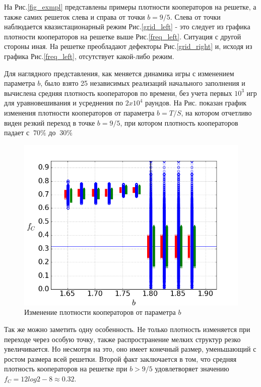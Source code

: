 \documentclass[a4paper]{article}
\begin{document}
	\par На Рис.\ref{fig_exmpl} представлены примеры плотности кооператоров на решетке, а также самих решеток слева и справа от точки $b=9/5$. Слева от точки наблюдается квазистационарный режим Рис.\ref{grid_left} - это следует из графика плотности кооператоров на решетке выше Рис.\ref{freq_left}. Ситуация с другой стороны иная. На решетке преобладают дефекторы Рис.\ref{grid_right} и, исходя из графика Рис.\ref{freq_left}, отсутствует какой-либо режим.
		
	\par Для наглядного представления, как меняется динамика игры с изменением параметра $b$, было взято 25 независимых реализаций начального заполнения и вычислена средняя плотность кооператоров по времени, без учета первых $10^{3}$ игр для уравновешивания и усреднения по $2 x 10^{4}$ раундов. На Рис. показан график изменения плотности кооператоров от параметра $b=T/S$, на котором отчетливо виден резкий переход в точке $b=9/5$, при котором плотность кооператоров падает с $~70\% $ до $~30\%$
	
	\begin{figure}[H]
		\label{freq}
		\centering
		\includegraphics[width=0.7\linewidth]{fig1_1.png}
		\caption{Изменение плотности кооператоров от параметра $b$}
	\end{figure}
	
	
	\par Так же можно заметить одну особенность. Не только плотность изменяется при  переходе через особую точку, также распространение мелких структур резко увеличивается. Но несмотря на это, оно имеет конечный размер, уменьшающий с ростом размера всей решетки. Второй факт заключается в том, что средняя плотность кооператоров на решетке при $b>9/5$ удовлетворяет значению $ f_{C} = 12log2-8 \approx 0.32$.
	
\end{document}
